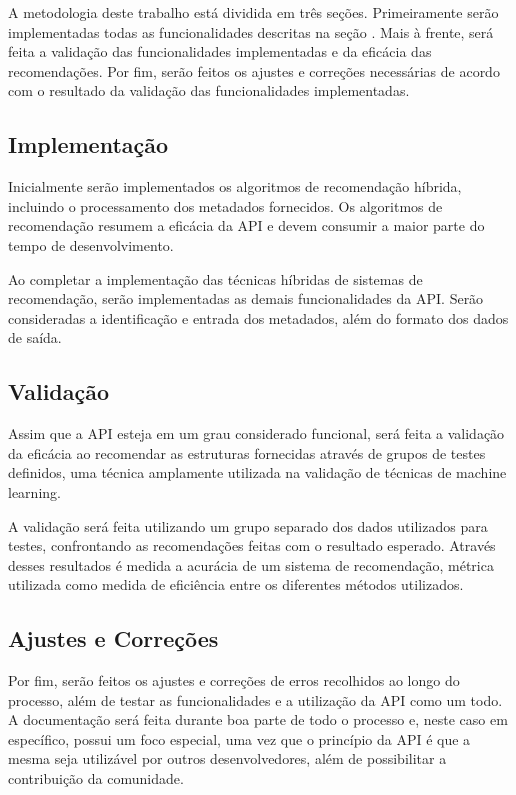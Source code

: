 \documentclass[12pt, openright, oneside, a4paper, brazil]{abntex2}
\begin{document}
A metodologia deste trabalho está dividida em três seções. Primeiramente serão implementadas todas as funcionalidades descritas na seção . Mais à frente, será feita a validação das funcionalidades implementadas e da eficácia das recomendações. Por fim, serão feitos os ajustes e correções necessárias de acordo com o resultado da validação das funcionalidades implementadas.

\subsection{Implementação}

Inicialmente serão implementados os algoritmos de recomendação híbrida, incluindo o processamento dos metadados fornecidos. Os algoritmos de recomendação resumem a eficácia da API e devem consumir a maior parte do tempo de desenvolvimento.

Ao completar a implementação das técnicas híbridas de sistemas de recomendação, serão implementadas as demais funcionalidades da API. Serão consideradas a identificação e entrada dos metadados, além do formato dos dados de saída.

\subsection{Validação}

Assim que a API esteja em um grau considerado funcional, será feita a validação da eficácia ao recomendar as estruturas fornecidas através de grupos de testes definidos, uma técnica amplamente utilizada na validação de técnicas de machine learning.

A validação será feita utilizando um grupo separado dos  dados utilizados para testes, confrontando as recomendações feitas com o resultado esperado. Através desses resultados é medida a acurácia de um sistema de recomendação, métrica utilizada como medida de eficiência entre os diferentes métodos utilizados.

\subsection{Ajustes e Correções}

Por fim, serão feitos os ajustes e correções de erros recolhidos ao longo do processo, além de testar as funcionalidades e a utilização da API como um todo. A documentação será feita durante boa parte de todo o processo e, neste caso em específico, possui um foco especial, uma vez que o princípio da API é que a mesma seja utilizável por outros desenvolvedores, além de possibilitar a contribuição da comunidade.
\end{document}

